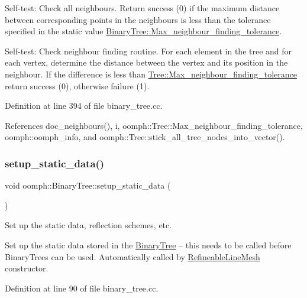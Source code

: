 Self-\/test\+: Check all neighbours. Return success (0) if the maximum distance between corresponding points in the neighbours is less than the tolerance specified in the static value \hyperlink{classoomph_1_1Tree_aef9abebc166fa3bf81ecb59ec0d5d6b2}{Binary\+Tree\+::\+Max\+\_\+neighbour\+\_\+finding\+\_\+tolerance}. 

Self-\/test\+: Check neighbour finding routine. For each element in the tree and for each vertex, determine the distance between the vertex and its position in the neighbour. If the difference is less than \hyperlink{classoomph_1_1Tree_aef9abebc166fa3bf81ecb59ec0d5d6b2}{Tree\+::\+Max\+\_\+neighbour\+\_\+finding\+\_\+tolerance} return success (0), otherwise failure (1). 

Definition at line 394 of file binary\+\_\+tree.\+cc.



References doc\+\_\+neighbours(), i, oomph\+::\+Tree\+::\+Max\+\_\+neighbour\+\_\+finding\+\_\+tolerance, oomph\+::oomph\+\_\+info, and oomph\+::\+Tree\+::stick\+\_\+all\+\_\+tree\+\_\+nodes\+\_\+into\+\_\+vector().

\mbox{\label{classoomph_1_1BinaryTree_a46528d3d7749ee316f193f28b5abd8fb}} 
\subsubsection{\texorpdfstring{setup\+\_\+static\+\_\+data()}{setup\_static\_data()}}
{\footnotesize\ttfamily void oomph\+::\+Binary\+Tree\+::setup\+\_\+static\+\_\+data (\begin{DoxyParamCaption}{ }\end{DoxyParamCaption})\hspace{0.3cm}{\ttfamily [static]}}



Set up the static data, reflection schemes, etc. 

Set up the static data stored in the \hyperlink{classoomph_1_1BinaryTree}{Binary\+Tree} -- this needs to be called before Binary\+Trees can be used. Automatically called by \hyperlink{classoomph_1_1RefineableLineMesh}{Refineable\+Line\+Mesh} constructor. 

Definition at line 90 of file binary\+\_\+tree.\+cc.



